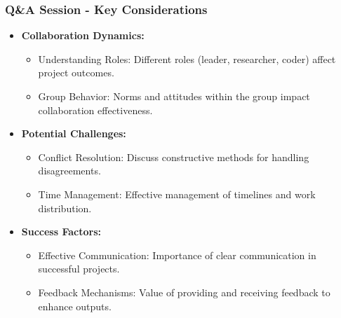\documentclass[aspectratio=169]{beamer}
\begin{document}
\begin{frame}[fragile]
    \frametitle{Q\&A Session - Key Considerations}
    \begin{itemize}
        \item \textbf{Collaboration Dynamics:}
            \begin{itemize}
                \item Understanding Roles: Different roles (leader, researcher, coder) affect project outcomes.
                \item Group Behavior: Norms and attitudes within the group impact collaboration effectiveness.
            \end{itemize}
        \item \textbf{Potential Challenges:}
            \begin{itemize}
                \item Conflict Resolution: Discuss constructive methods for handling disagreements.
                \item Time Management: Effective management of timelines and work distribution.
            \end{itemize}
        \item \textbf{Success Factors:}
            \begin{itemize}
                \item Effective Communication: Importance of clear communication in successful projects.
                \item Feedback Mechanisms: Value of providing and receiving feedback to enhance outputs.
            \end{itemize}
    \end{itemize}
\end{frame}
\end{document}
